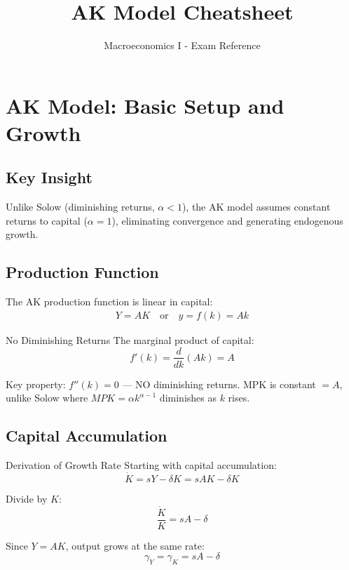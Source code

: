 \documentclass[a4paper,11pt]{article}
\title{\textbf{AK Model Cheatsheet}}
\author{Macroeconomics I - Exam Reference}
\date{}
\begin{document}
\maketitle

\section{AK Model: Basic Setup and Growth}

\subsection*{Key Insight}
Unlike Solow (diminishing returns, $\alpha < 1$), the AK model assumes constant returns to capital ($\alpha = 1$), eliminating convergence and generating endogenous growth.

\subsection{Production Function}

The AK production function is linear in capital:
\begin{align*}
Y = A K \quad \text{or} \quad y = f(k) = A k
\tag{AK-Production}
\end{align*}

\begin{derivationbox}{No Diminishing Returns}
The marginal product of capital:
\[
f'(k) = \frac{d}{dk}(Ak) = A
\]

Key property: $f''(k) = 0$ — NO diminishing returns. MPK is constant $= A$, unlike Solow where $MPK = \alpha k^{\alpha-1}$ diminishes as $k$ rises.
\end{derivationbox}

\subsection{Capital Accumulation}

\begin{derivationbox}{Derivation of Growth Rate}
Starting with capital accumulation:
\[
\dot{K} = sY - \delta K = sAK - \delta K
\]

Divide by $K$:
\[
\frac{\dot{K}}{K} = sA - \delta
\]

Since $Y = AK$, output grows at the same rate:
\[
\gamma_Y = \gamma_K = sA - \delta
\tag{Growth-Rate}
\]
\end{derivationbox}
\end{document}
